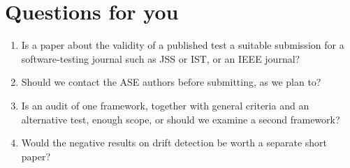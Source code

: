 \documentclass[11pt,a4paper]{article}
\begin{document}
\section{Questions for you}
\begin{enumerate}
  \item Is a paper about the validity of a published test a suitable submission for a
        software-testing journal such as JSS or IST, or an IEEE journal?
  \item Should we contact the ASE authors before submitting, as we plan to?
  \item Is an audit of one framework, together with general criteria and an alternative test, enough
        scope, or should we examine a second framework?
  \item Would the negative results on drift detection be worth a separate short paper?
\end{enumerate}
\end{document}
